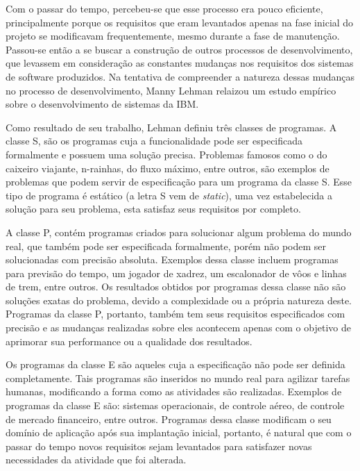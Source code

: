 \documentclass[a4paper, 12pt, twoside]{book}
\begin{document}
        Com o passar do tempo, percebeu-se que esse processo era pouco eficiente, principalmente porque os requisitos
        que eram levantados apenas na fase inicial do projeto se modificavam frequentemente, mesmo durante a 
        fase de manutenção. Passou-se então a se buscar a construção de outros processos de desenvolvimento, 
        que levassem em consideração as constantes mudanças nos requisitos dos sistemas de software produzidos.
        Na tentativa de compreender a natureza dessas mudanças no processo de desenvolvimento, Manny Lehman relaizou
        um estudo empírico sobre o desenvolvimento de sistemas da IBM.
        
        Como resultado de seu trabalho, Lehman definiu três classes de programas. A classe S, são os programas 
        cuja a funcionalidade pode ser especificada formalmente e possuem uma solução precisa. Problemas famosos 
        como o do caixeiro viajante, n-rainhas, do fluxo máximo, entre outros, são exemplos de problemas que 
        podem servir de especificação para um programa da classe S. Esse tipo de programa é 
        estático (a letra S vem de \textit{static}), uma vez estabelecida a solução para seu problema, esta 
        satisfaz seus requisitos por completo.
        
        A classe P, contém programas criados para solucionar algum problema do mundo real, que também pode
        ser especificada formalmente, porém não podem ser solucionadas com precisão absoluta. Exemplos dessa classe
        incluem programas para previsão do tempo, um jogador de xadrez, um escalonador de vôos e linhas de trem, entre 
        outros. Os resultados obtidos por programas dessa classe não são soluções exatas do problema, devido a 
        complexidade ou a própria natureza deste. Programas da classe P, portanto, também tem seus requisitos 
        especificados com precisão e as mudanças realizadas sobre eles acontecem apenas com o objetivo de aprimorar
        sua performance ou a qualidade dos resultados.
        
        Os programas da classe E são aqueles cuja a especificação não pode ser definida completamente. Tais programas
        são inseridos no mundo real para agilizar tarefas humanas, modificando a forma como as atividades são 
        realizadas. Exemplos de programas da classe E são: sistemas operacionais, de controle aéreo, de 
        controle de mercado financeiro, entre outros. Programas dessa classe modificam o seu domínio de 
        aplicação após sua implantação inicial, portanto, é natural que com o passar do tempo novos 
        requisitos sejam levantados para satisfazer novas necessidades da atividade que foi alterada.
        
\end{document}
